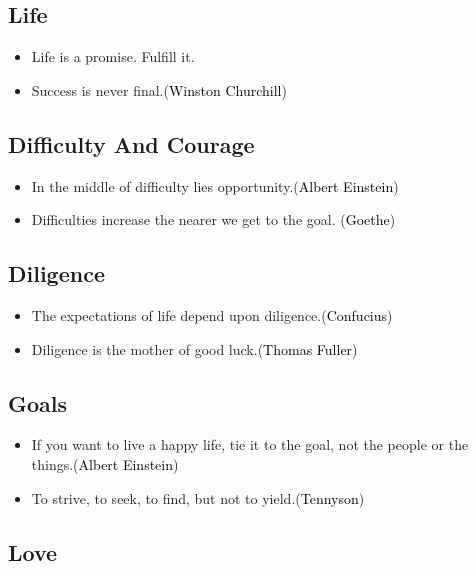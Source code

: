 \documentclass{article}
\begin{document}
\subsection{Life}
\label{sec:life}

\begin{itemize}
\item Life is a promise. Fulfill it.
\item Success is never final.(\textcolor{black}{Winston Churchill})
\end{itemize}

\subsection{Difficulty And Courage}
\label{sec:difficulty-courage}
\begin{itemize}
\item In the middle of difficulty lies opportunity.(\textcolor{black}{Albert Einstein})
\item Difficulties increase the nearer we get to the goal. (\textcolor{black}{Goethe})
\end{itemize}

\subsection{Diligence}
\label{sec:diligence}

\begin{itemize}
\item The expectations of life depend upon diligence.(\textcolor{black}{Confucius})
\item Diligence is the mother of good luck.(\textcolor{black}{Thomas Fuller})
\end{itemize}

\subsection{Goals}
\label{sec:goals}

\begin{itemize}
\item If you want to live a happy life, tie it to the goal, not the people or the
  things.(\textcolor{black}{Albert Einstein})
\item To strive, to seek, to find, but not to yield.(\textcolor{black}{Tennyson})
\end{itemize}

\subsection{Love}
\label{sec:love}
\end{document}
